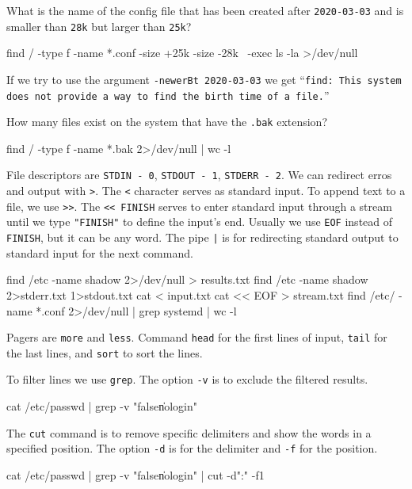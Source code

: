 \documentclass[a4paper,12pt]{article}
\newcommand{\bashinline}[1]{\texttt{#1}}
\begin{document}
What is the name of the config file that has been created after \bashinline{2020-03-03} and is smaller than \bashinline{28k} but larger than \bashinline{25k}?
\begin{bash}
find / -type f -name *.conf -size +25k -size -28k \
-exec ls -la {} >/dev/null
\end{bash}

If we try to use the argument \bashinline{-newerBt 2020-03-03} we get
``\texttt{find: This system does not provide a way to find the birth time of a file.}''

\n

How many files exist on the system that have the \bashinline{.bak} extension?
\begin{bash}
find / -type f -name *.bak 2>/dev/null | wc -l
\end{bash}

\n

File descriptors are \bashinline{STDIN - 0}, \bashinline{STDOUT - 1}, \bashinline{STDERR - 2}. We can redirect erros and output with \bashinline{>}. The \bashinline{<} character serves as standard input. To append text to a file, we use \bashinline{>>}. The \bashinline{<< FINISH} serves to enter standard input through a stream until we type \bashinline{"FINISH"} to define the input's end. Usually we use \bashinline{EOF} instead of \bashinline{FINISH}, but it can be any word. The pipe \bashinline{|} is for redirecting standard output to standard input for the next command.
\begin{bash}
find /etc -name shadow 2>/dev/null > results.txt
find /etc -name shadow 2>stderr.txt 1>stdout.txt
cat < input.txt
cat << EOF > stream.txt
find /etc/ -name *.conf 2>/dev/null | grep systemd | wc -l
\end{bash}

\n

Pagers are \bashinline{more} and \bashinline{less}. Command \bashinline{head} for the first lines of input, \bashinline{tail} for the last lines, and \bashinline{sort} to sort the lines.

\n

To filter lines we use \bashinline{grep}. The option \bashinline{-v} is to exclude the filtered results.
\begin{bash}
cat /etc/passwd | grep -v "false\|nologin"
\end{bash}

The \bashinline{cut} command is to remove specific delimiters and show the words in a specified position. The option \bashinline{-d} is for the delimiter and \bashinline{-f} for the position.
\begin{bash}
cat /etc/passwd | grep -v "false\|nologin" | cut -d":" -f1
\end{bash}
\end{document}
